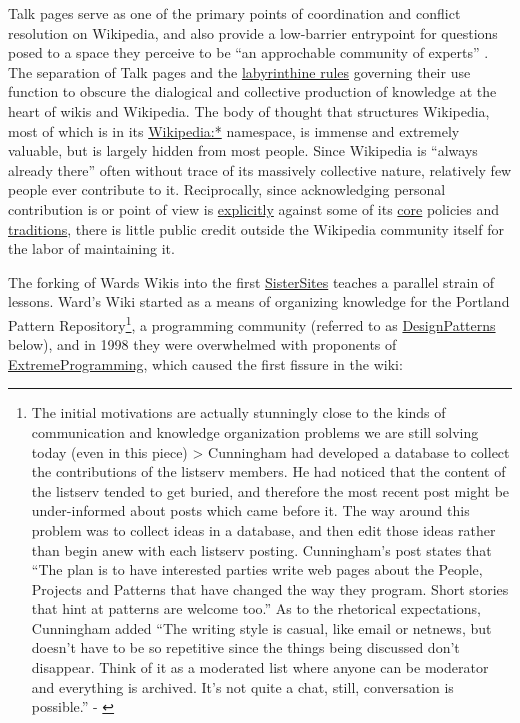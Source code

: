 \documentclass[10pt]{tufte-book}
\begin{document}
Talk pages serve as one of the primary points of coordination and
conflict resolution on Wikipedia, and also provide a low-barrier
entrypoint for questions posed to a space they perceive to be ``an
approchable community of experts'' \citep{viegasTalkYouType2007} .
The separation of Talk pages and the
\href{https://en.wikipedia.org/wiki/Wikipedia:Talk_page_guidelines}{labyrinthine
rules} governing their use function to obscure the dialogical and
collective production of knowledge at the heart of wikis and Wikipedia.
The body of thought that structures Wikipedia, most of which is in its
\href{https://en.wikipedia.org/wiki/Wikipedia:Community_portal}{Wikipedia:*}
namespace, is immense and extremely valuable, but is largely hidden from
most people. Since Wikipedia is ``always already there'' often without
trace of its massively collective nature, relatively few people ever
contribute to it. Reciprocally, since acknowledging personal
contribution is or point of view is
\href{https://en.wikipedia.org/wiki/Wikipedia:No_original_research}{explicitly}
against some of its
\href{https://en.wikipedia.org/wiki/Wikipedia:Neutral_point_of_view}{core}
policies and
\href{https://en.wikipedia.org/wiki/Wikipedia:Avoid_thread_mode}{traditions},
there is little public credit outside the Wikipedia community itself for
the labor of maintaining it.

The forking of Wards Wikis into the first
\href{http://wiki.c2.com/?SisterSites}{SisterSites} teaches a parallel
strain of lessons. Ward's Wiki started as a means of organizing
knowledge for the Portland Pattern Repository\footnote{The initial
  motivations are actually stunningly close to the kinds of
  communication and knowledge organization problems we are still solving
  today (even in this piece) \textgreater{} Cunningham had developed a
  database to collect the contributions of the listserv members. He had
  noticed that the content of the listserv tended to get buried, and
  therefore the most recent post might be under-informed about posts
  which came before it. The way around this problem was to collect ideas
  in a database, and then edit those ideas rather than begin anew with
  each listserv posting. Cunningham's post states that ``The plan is to
  have interested parties write web pages about the People, Projects and
  Patterns that have changed the way they program. Short stories that
  hint at patterns are welcome too.'' As to the rhetorical expectations,
  Cunningham added ``The writing style is casual, like email or netnews,
  but doesn't have to be so repetitive since the things being discussed
  don't disappear. Think of it as a moderated list where anyone can be
  moderator and everything is archived. It's not quite a chat, still,
  conversation is possible.'' - \citep{cummingsWhatWasWikiWhy2009} }, a programming community (referred to as
\href{http://wiki.c2.com/?DesignPatterns}{DesignPatterns} below), and in
1998 they were overwhelmed with proponents of
\href{http://wiki.c2.com/?ExtremeProgramming}{ExtremeProgramming}, which
caused the first fissure in the wiki:
\end{document}
